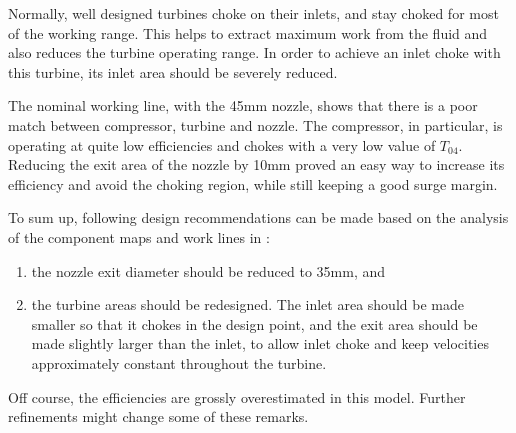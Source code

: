Normally, well designed turbines choke on their inlets, and stay choked for most of the working range.
This helps to extract maximum work from the fluid and also reduces the turbine operating range. 
In order to achieve an inlet choke with this turbine, its inlet area should be severely reduced.

The nominal working line, with the 45mm nozzle, shows that there is a poor match between compressor, turbine and nozzle.
The compressor, in particular, is operating at quite low efficiencies and chokes with a very low value of $T_{04}$. 
Reducing the exit area of the nozzle by 10mm proved an easy way to increase its efficiency and avoid the choking region, while still keeping a good surge margin. 

To sum up, following design recommendations can be made based on the analysis of the component maps and work lines in :
\begin{enumerate}
    \item the nozzle exit diameter should be reduced to 35mm, and
    \item the turbine areas should be redesigned. The inlet area should be made smaller so that it chokes in the design point, and the exit area should be made slightly larger than the inlet, to allow inlet choke and keep velocities approximately constant throughout the turbine.
\end{enumerate}

Off course, the efficiencies are grossly overestimated in this model. Further refinements might change some of these remarks.

